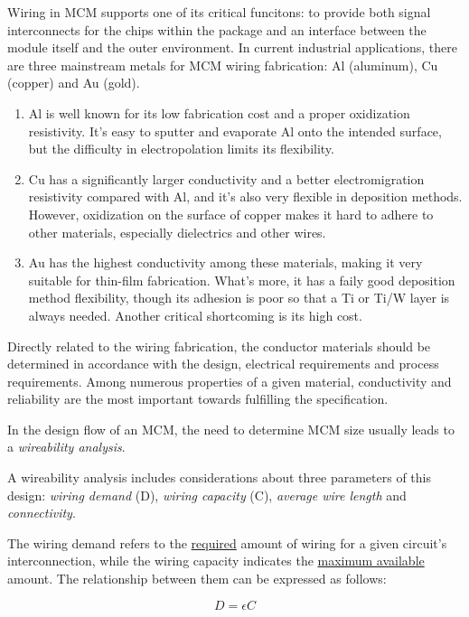 \begin{spacing}{1.5}
Wiring in MCM supports one of its critical funcitons: to provide both signal interconnects for the chips within the package and an interface between the module itself and the outer environment. In current industrial applications, there are three mainstream metals for MCM wiring fabrication: Al (aluminum), Cu (copper) and Au (gold). 

\begin{enumerate}
    \item Al is well known for its low fabrication cost and a proper oxidization resistivity. It's easy to sputter and evaporate Al onto the intended surface, but the difficulty in electropolation limits its flexibility. 
    \item Cu has a significantly larger conductivity and a better electromigration resistivity compared with Al, and it's also very flexible in deposition methods. However, oxidization on the surface of copper makes it hard to adhere to other materials, especially dielectrics and other wires. 
    \item Au has the highest conductivity among these materials, making it very suitable for thin-film fabrication. What's more, it has a faily good deposition method flexibility, though its adhesion is poor so that a Ti or Ti/W layer is always needed. Another critical shortcoming is its high cost. 
\end{enumerate} 

Directly related to the wiring fabrication, the conductor materials should be determined in accordance with the design, electrical requirements and process requirements. Among numerous properties of a given material, conductivity and reliability are the most important towards fulfilling the specification. \cite{chen2006vlsi}

In the design flow of an MCM, the need to determine MCM size usually leads to a \textit{wireability analysis}. 

A wireability analysis includes considerations about three parameters of this design: \textit{wiring demand} (D), \textit{wiring capacity} (C), \textit{average wire length} and \textit{connectivity}. 

The wiring demand refers to the \underline{required} amount of wiring for a given circuit's interconnection, while the wiring capacity indicates the \underline{maximum available} amount. The relationship between them can be expressed as follows: 

\begin{equation}
    \label{eq.demand} 
    D=\epsilon C
\end{equation}


\end{spacing}
